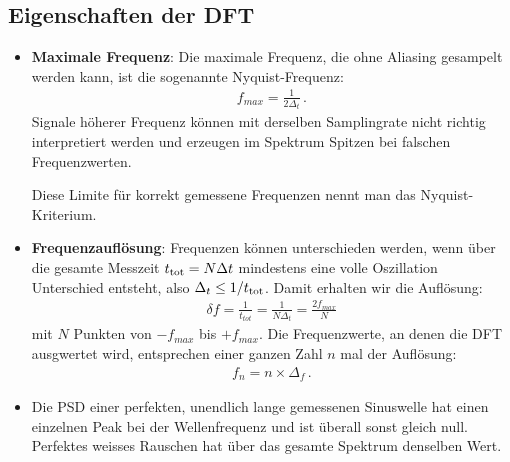 \subsection{Eigenschaften der DFT}
\begin{itemize}
\item \textbf{Maximale Frequenz}: Die maximale Frequenz, die ohne Aliasing gesampelt werden kann, ist die sogenannte Nyquist-Frequenz:
        \begin{align}
        f_{max} = \frac{ 1 }{ 2 \Delta_t }\,.
        \label{eq:vl7-4}
        \end{align}
        Signale höherer Frequenz können mit derselben Samplingrate nicht richtig interpretiert werden und erzeugen im Spektrum Spitzen bei falschen Frequenzwerten.
        \begin{center}
        \begin{tcolorbox}[enhanced,width=6in,drop fuzzy shadow southwest,
            colframe=red!50!black,colback=red!05]
           Diese Limite für korrekt gemessene Frequenzen nennt man das Nyquist-Kriterium.
        \end{tcolorbox}
        \end{center}
        \item \textbf{Frequenzaufl\"osung}: Frequenzen können unterschieden werden, wenn über die gesamte Messzeit $t_\mathrm{tot}=N\Delta t$ mindestens eine volle Oszillation Unterschied entsteht, also $\Delta_t \leq 1/t_\mathrm{tot}$. Damit erhalten wir die Aufl\"osung:
        \begin{align}
        \delta f  = \frac{ 1 }{t_{tot}} = \frac{ 1 }{ N \Delta_t} = \frac{ 2 f_{max} }{ N }
        \label{eq:vl7-6}
        \end{align}
        mit $N$ Punkten von $-f_{max}$ bis $+f_{max}$. Die Frequenzwerte, an denen die DFT ausgwertet wird, entsprechen einer ganzen Zahl $n$ mal der Aufl\"osung:
        \begin{align}
        f_n = n \times \Delta_f\,.
        \label{eq:vl7-7}
        \end{align}
        \item Die PSD einer perfekten, unendlich lange gemessenen Sinuswelle hat einen einzelnen Peak bei der Wellenfrequenz und ist überall sonst gleich null. Perfektes weisses Rauschen hat über das gesamte Spektrum denselben Wert.
\end{itemize}


